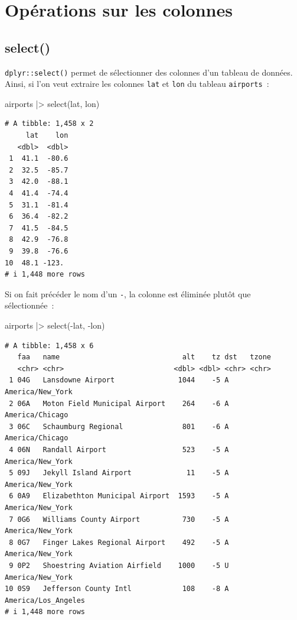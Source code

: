 \documentclass[
  letterpaper,
  DIV=11,
  numbers=noendperiod,
  oneside]{scrreprt}
\newenvironment{Shaded}{\begin{snugshade}}{\end{snugshade}}
\newcommand{\FunctionTok}[1]{\textcolor[rgb]{0.28,0.35,0.67}{#1}}
\newcommand{\NormalTok}[1]{\textcolor[rgb]{0.00,0.23,0.31}{#1}}
\newcommand{\SpecialCharTok}[1]{\textcolor[rgb]{0.37,0.37,0.37}{#1}}
\begin{document}
\hypertarget{opuxe9rations-sur-les-colonnes}{%
\section{Opérations sur les
colonnes}\label{opuxe9rations-sur-les-colonnes}}

\hypertarget{sec-dplyr-select}{%
\subsection{select()}\label{sec-dplyr-select}}

\texttt{dplyr::select()} permet de sélectionner des colonnes d'un
tableau de données. Ainsi, si l'on veut extraire les colonnes
\texttt{lat} et \texttt{lon} du tableau \texttt{airports}~:

\begin{Shaded}
\begin{Highlighting}[]
\NormalTok{airports }\SpecialCharTok{|\textgreater{}} 
  \FunctionTok{select}\NormalTok{(lat, lon)}
\end{Highlighting}
\end{Shaded}

\begin{verbatim}
# A tibble: 1,458 x 2
     lat    lon
   <dbl>  <dbl>
 1  41.1  -80.6
 2  32.5  -85.7
 3  42.0  -88.1
 4  41.4  -74.4
 5  31.1  -81.4
 6  36.4  -82.2
 7  41.5  -84.5
 8  42.9  -76.8
 9  39.8  -76.6
10  48.1 -123. 
# i 1,448 more rows
\end{verbatim}

Si on fait précéder le nom d'un \texttt{-}, la colonne est éliminée
plutôt que sélectionnée~:

\begin{Shaded}
\begin{Highlighting}[]
\NormalTok{airports }\SpecialCharTok{|\textgreater{}} 
  \FunctionTok{select}\NormalTok{(}\SpecialCharTok{{-}}\NormalTok{lat, }\SpecialCharTok{{-}}\NormalTok{lon)}
\end{Highlighting}
\end{Shaded}

\begin{verbatim}
# A tibble: 1,458 x 6
   faa   name                             alt    tz dst   tzone              
   <chr> <chr>                          <dbl> <dbl> <chr> <chr>              
 1 04G   Lansdowne Airport               1044    -5 A     America/New_York   
 2 06A   Moton Field Municipal Airport    264    -6 A     America/Chicago    
 3 06C   Schaumburg Regional              801    -6 A     America/Chicago    
 4 06N   Randall Airport                  523    -5 A     America/New_York   
 5 09J   Jekyll Island Airport             11    -5 A     America/New_York   
 6 0A9   Elizabethton Municipal Airport  1593    -5 A     America/New_York   
 7 0G6   Williams County Airport          730    -5 A     America/New_York   
 8 0G7   Finger Lakes Regional Airport    492    -5 A     America/New_York   
 9 0P2   Shoestring Aviation Airfield    1000    -5 U     America/New_York   
10 0S9   Jefferson County Intl            108    -8 A     America/Los_Angeles
# i 1,448 more rows
\end{verbatim}
\end{document}
